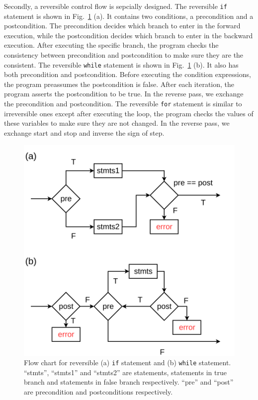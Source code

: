 \documentclass[aps,twocolumn,longbibliography,english,superscriptaddress]{revtex4-1}
\newcommand{\<}{\langle}
\renewcommand{\>}{\rangle}
\newcommand{\Fig}[1]{Fig.~\ref{#1}}
\theoremstyle{definition}\newtheorem{definition}{\textit{Definition}}
\begin{document}
Secondly, a reversible control flow is sepcially designed.
The reversible \texttt{if} statement is shown in \Fig{fig:controlflow} (a). It contains two conditions, a precondition and a postcondition. The precondition decides which branch to enter in the forward execution, while the postcondition decides which branch to enter in the backward execution. After executing the specific branch, the program checks the consistency between precondition and postcondition to make sure they are the consistent.
The reversible \texttt{while} statement is shown in \Fig{fig:controlflow} (b). It also has both precondition and postcondition. Before executing the condition expressions, the program preassumes the postcondition is false.
After each iteration, the program asserts the postcondition to be true. In the reverse pass, we exchange the precondition and postcondition.
The reversible \texttt{for} statement is similar to irreversible ones except after executing the loop, the program checks the values of these variables to make sure they are not changed. In the reverse pass, we exchange start and stop and inverse the sign of step.
\begin{figure}
    \centerline{\includegraphics[width=0.8\columnwidth,trim={0 0cm 0 0cm},clip]{images/controlflow.pdf}}
    \caption{Flow chart for reversible (a) \texttt{if} statement and (b) \texttt{while} statement. ``stmts'', ``stmts1'' and ``stmts2'' are statements, statements in true branch and statements in false branch respectively. ``pre'' and ``post'' are precondition and postconditions respectively.}\label{fig:controlflow}
\end{figure}
\end{document}
